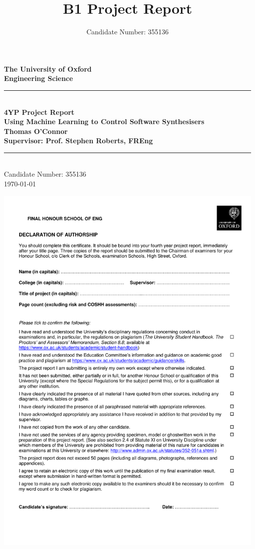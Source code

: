 \documentclass[11pt, oneside]{report}   	%
\title{B1 Project Report}
\author{Candidate Number: 355136}
\date{}							%
\newenvironment{changemargin}[3]{%
\begin{list}{}{%
\setlength{\topsep}{0pt}%
\setlength{\leftmargin}{#1}%
\setlength{\rightmargin}{#2}%
\setlength{\topmargin}{#3}%
\setlength{\listparindent}{\parindent}%
\setlength{\itemindent}{\parindent}%
\setlength{\parsep}{\parskip}%
}%
\item[]}{\end{list}}
\begin{document}

\begin{titlepage}
\begin{center}
\vspace*{1cm}
\Large {\textbf{The University of Oxford}}\\
\Large{\textbf{Engineering Science}}\\
\vfill
\noindent\rule{5in}{0.6pt}\\[1mm]
\huge{\textbf{4YP Project Report}}\\[3mm]
\Large{\textbf{Using Machine Learning to Control Software Synthesisers}}\\[1mm]
\Large{\textbf{Thomas O'Connor}}\\[1mm]
\Large{\textbf{Supervisor: Prof. Stephen Roberts, FREng}}\\[1mm]
\noindent\rule{5in}{0.6pt}\\[1mm]
\vfill
Candidate Number: 355136\\
\today\\
\end{center}
\end{titlepage}

\begin{changemargin}{-1in}{0in}{-1.5in}
\includegraphics{Declaration_of_Authorship_form_2018.pdf}
\thispagestyle{empty}
\end{changemargin}
\end{document}
